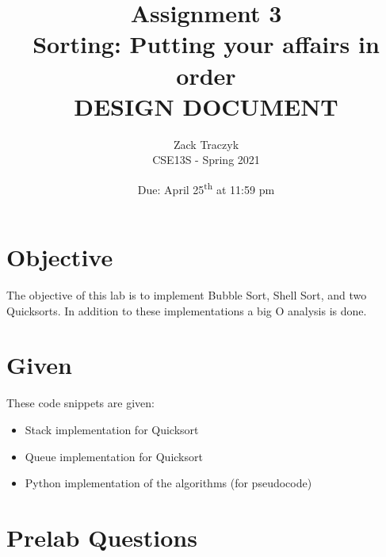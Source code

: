 \documentclass[12pt]{article}
\title{%
    \textbf{Assignment 3 \\ 
    Sorting: Putting your affairs in order \\
    \large DESIGN DOCUMENT} }
\author{Zack Traczyk \\ CSE13S - Spring 2021}
\date{Due: April 25\textsuperscript{th} at 11:59 pm}
\begin{document}
    \maketitle


    \section{Objective}

    The objective of this lab is to implement Bubble Sort, Shell Sort, and two Quicksorts. In addition to these implementations a big O analysis is done.

    \section{Given}

    These code snippets are given:

    \begin{itemize}
        \item Stack implementation for Quicksort
        \item Queue implementation for Quicksort
        \item Python implementation of the algorithms (for pseudocode)

    \end{itemize}


    \section{Prelab Questions}
\end{document}
